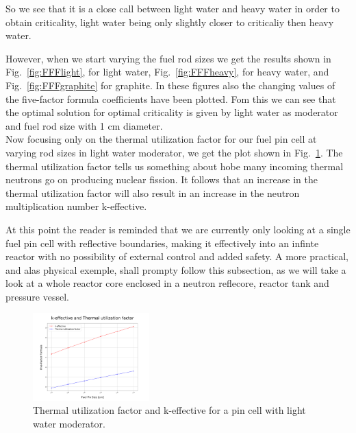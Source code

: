 \documentclass[twocolumn,a4paper,10pt]{article}
\begin{document}
\par
So we see that it is a close call between light water and heavy water in order to obtain criticality, light water being only slightly closer to criticaliy then heavy water.\\
\par
However, when we start varying the fuel rod sizes we get the results shown in Fig.~\ref{fig:FFFlight}, for light water, Fig.~\ref{fig:FFFheavy}, for heavy water, and Fig.~\ref{fig:FFFgraphite} for graphite. In these figures also the changing values of the five-factor formula coefficients have been plotted. Fom this we can see that the optimal solution for optimal criticality is given by light water as moderator and fuel rod size with 1 cm diameter. \\
Now focusing only on the thermal utilization factor for our fuel pin cell at varying rod sizes in light water moderator, we get the plot shown in Fig.~\ref{fig:PCLWkeff}. The thermal utilization factor tells us something about hobe many incoming thermal neutrons go on producing nuclear fission. It follows that an increase in the thermal utilization factor will also result in an increase in the neutron multiplication number k-effective. \\
\par
At this point the reader is reminded that we are currently only looking at a single fuel pin cell with reflective boundaries, making it effectively into an infinte reactor with no possibility of external control and added safety. A more practical, and alas physical exemple, shall prompty follow this subsection, as we will take a look at a whole reactor core enclosed in a neutron reflecore, reactor tank and pressure vessel.

\begin{figure}[b]
  \centering
  \includegraphics[width=0.4\textwidth]{../Pin_Cell/Light_Water_kandf.png}
  \caption{Thermal utilization factor and k-effective for a pin cell with light water moderator.}
  \label{fig:PCLWkeff}
\end{figure}
\end{document}

